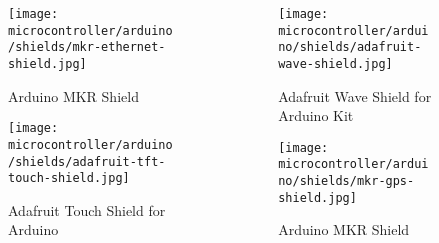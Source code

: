 \begin{frame}
    \begin{columns}
        \begin{column}{0.5\textwidth}
            \begin{figure}
                \texttt{[image: microcontroller/arduino/shields/mkr-ethernet-shield.jpg]}
                \caption{Arduino\textregistered{} MKR  Shield}
            \end{figure}
            \begin{figure}
                \texttt{[image: microcontroller/arduino/shields/adafruit-tft-touch-shield.jpg]}
                \caption{Adafruit  Touch Shield for Arduino\textregistered{}}
            \end{figure}
        \end{column}
        \begin{column}{0.5\textwidth}
            \begin{figure}
                \texttt{[image: microcontroller/arduino/shields/adafruit-wave-shield.jpg]}
                \caption{Adafruit Wave Shield for Arduino\textregistered{} Kit}
            \end{figure}
            \begin{figure}
                \texttt{[image: microcontroller/arduino/shields/mkr-gps-shield.jpg]}
                \caption{Arduino\textregistered{} MKR  Shield}
            \end{figure}
        \end{column}
    \end{columns}
\end{frame}